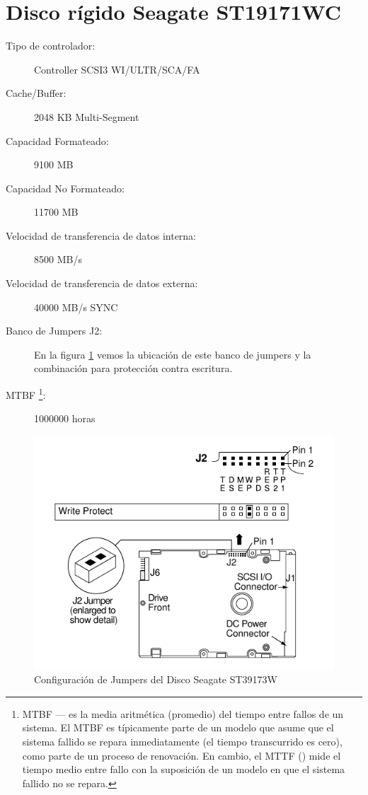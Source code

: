 \documentclass[a4paper]{article}
\begin{document}
\section{Disco rígido Seagate ST19171WC}
\begin{description}
\item[Tipo de controlador:] Controller SCSI3 WI/ULTR/SCA/FA
\item[Cache/Buffer:] 2048 KB Multi-Segment
\item[Capacidad Formateado:] 9100 MB
\item[Capacidad No Formateado:] 11700 MB
\item[Velocidad de transferencia de datos interna:] 8500 MB/s 
\item[Velocidad de transferencia de datos externa:] 40000 MB/s SYNC
\item[Banco de Jumpers J2:] En la figura \ref{protescritura} vemos la ubicación
  de este banco de jumpers y la combinación para protección contra escritura.
\item[MTBF%
  \footnote{MTBF ---- es la media
    aritmética (promedio) del tiempo entre fallos de un sistema. El MTBF es
    típicamente parte de un modelo que asume que el sistema fallido se repara
    inmediatamente (el tiempo transcurrido es cero), como parte de un proceso 
    de renovación. En cambio, el MTTF () mide el tiempo
    medio entre fallo con la suposición de un modelo en que el sistema fallido 
    no se repara.}:]%
  1000000 horas
\end{description}
%
\begin{figure}[H] \begin{center}
\includegraphics[scale=0.75]{imgs/pinesst19171wc} 
\end{center}
\caption{Configuración de Jumpers del Disco Seagate ST39173W}
\label{protescritura}
\end{figure}
%
\end{document}

